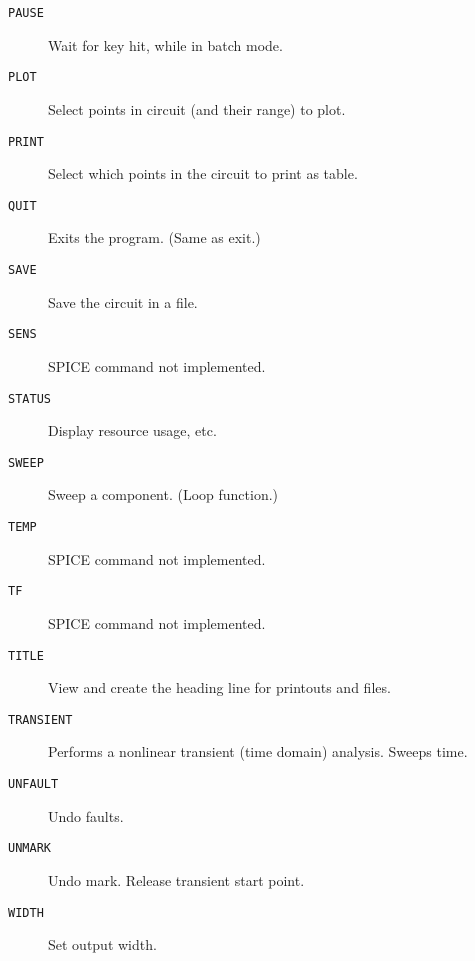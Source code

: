\begin{description}
\item[{\tt PAUSE}] Wait for key hit, while in batch mode.

\item[{\tt PLOT}] Select points in circuit (and their range) to plot.

\item[{\tt PRINT}] Select which points in the circuit to print as table.

\item[{\tt QUIT}] Exits the program.  (Same as exit.)

\item[{\tt SAVE}] Save the circuit in a file.

\item[{\tt SENS}] SPICE command not implemented.

\item[{\tt STATUS}] Display resource usage, etc.

\item[{\tt SWEEP}] Sweep a component.  (Loop function.)

\item[{\tt TEMP}] SPICE command not implemented.

\item[{\tt TF}] SPICE command not implemented.

\item[{\tt TITLE}] View and create the heading line for printouts and files.

\item[{\tt TRANSIENT}] Performs a nonlinear transient (time domain)
analysis.  Sweeps time.

\item[{\tt UNFAULT}] Undo faults.

\item[{\tt UNMARK}] Undo mark.  Release transient start point.

\item[{\tt WIDTH}] Set output width.

\end{description}

